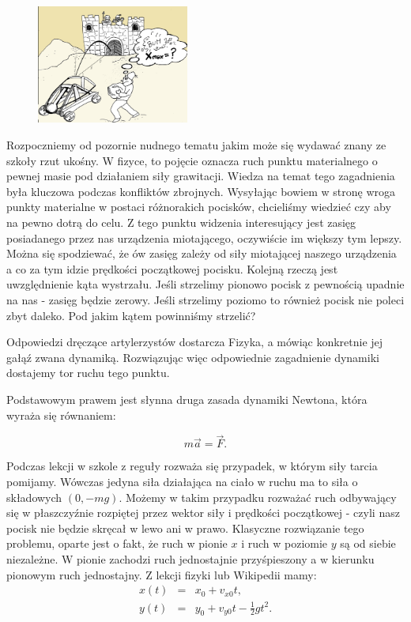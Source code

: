 \documentclass[10pt,twocolumn]{article}
\begin{document}
\begin{figure}
     \includegraphics[width=5cm]{1a.png}
\end{figure}
Rozpoczniemy od pozornie nudnego tematu jakim może się wydawać znany
ze szkoły rzut ukośny. W fizyce, to pojęcie oznacza ruch punktu
materialnego o pewnej masie pod działaniem siły grawitacji. Wiedza na
temat tego zagadnienia była kluczowa podczas konfliktów
zbrojnych. Wysyłając bowiem w stronę wroga punkty materialne w postaci
różnorakich pocisków, chcieliśmy wiedzieć czy aby na pewno dotrą do
celu. Z tego punktu widzenia interesujący jest zasięg posiadanego
przez nas urządzenia miotającego, oczywiście im większy tym
lepszy. Można się spodziewać, że ów zasięg zależy od siły miotającej
naszego urządzenia a co za tym idzie prędkości początkowej
pocisku. Kolejną rzeczą jest uwzględnienie kąta wystrzału. Jeśli
strzelimy pionowo pocisk z pewnością upadnie na nas - zasięg będzie
zerowy. Jeśli strzelimy poziomo to również pocisk nie poleci zbyt
daleko. Pod jakim kątem powinniśmy strzelić?

Odpowiedzi dręczące artylerzystów dostarcza Fizyka, a mówiąc
konkretnie jej gałąź zwana dynamiką. Rozwiązując więc odpowiednie
zagadnienie dynamiki dostajemy tor ruchu tego punktu. 

Podstawowym prawem jest słynna druga zasada dynamiki Newtona, która
wyraża się równaniem:

\begin{equation}
\label{eq:Ni}
m \vec  a = \vec F.
\end{equation}

Podczas lekcji w szkole z reguły rozważa się przypadek, w którym siły
tarcia pomijamy. Wówczas jedyna siła działająca na ciało w ruchu ma to
siła o składowych $(0,-mg)$. Możemy w takim przypadku rozważać ruch
odbywający się w płaszczyźnie rozpiętej przez wektor siły i prędkości
początkowej - czyli nasz pocisk nie będzie skręcał w lewo ani w
prawo. Klasyczne rozwiązanie tego problemu, oparte jest o fakt, że
ruch w pionie $x$ i ruch w poziomie $y$ są od siebie niezależne. W
pionie zachodzi ruch jednostajnie przyśpieszony a w kierunku pionowym
ruch jednostajny. Z lekcji fizyki lub Wikipedii\cite{wikirzut} mamy:
%
\begin{eqnarray}
\label{eq:param}
x(t) &=& x_0+v_{x0} t, \nonumber \\
y(t) &=& y_0 + v_{y0} t - \frac{1}{2}g t^2.
\end{eqnarray}
\end{document}
